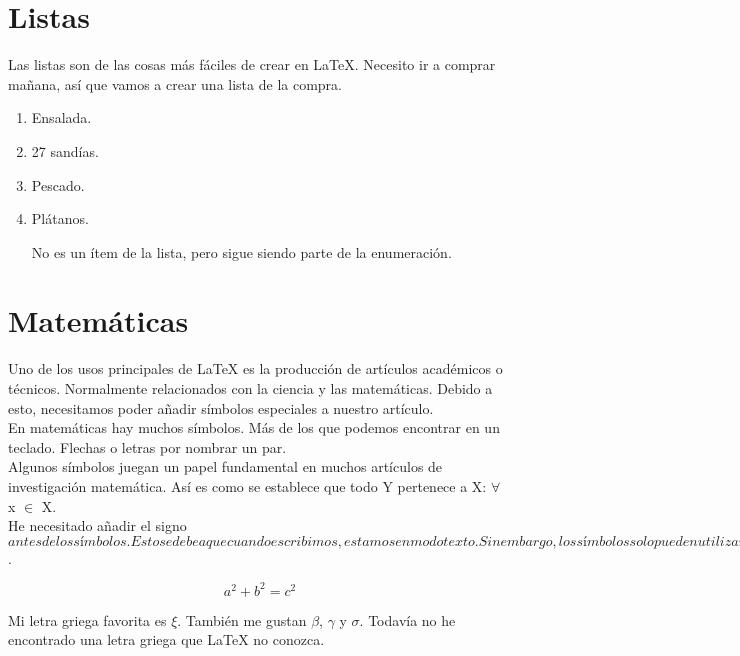\documentclass[12pt]{article}
\begin{document}
\section{Listas}
Las listas son de las cosas más fáciles de crear en LaTeX. Necesito ir a comprar mañana, así que vamos a crear una lista de la compra.
\begin{enumerate} %
  \item Ensalada.
  \item 27 sandías.
  \item Pescado.
  \item[cuántos?] Plátanos.

  No es un ítem de la lista, pero sigue siendo parte de la enumeración.

\end{enumerate} %

\section{Matemáticas}

Uno de los usos principales de LaTeX es la producción de artículos académicos o técnicos. Normalmente relacionados con la ciencia y las matemáticas. Debido a esto, necesitamos poder añadir símbolos especiales a nuestro artículo.\\

En matemáticas hay muchos símbolos. Más de los que podemos encontrar en un teclado. Flechas o letras por nombrar un par.\\

Algunos símbolos juegan un papel fundamental en muchos artículos de investigación matemática. Así es como se establece que todo Y pertenece a X:  $\forall$ x $\in$ X. \\
He necesitado añadir el signo $ antes de los símbolos. Esto se debe a que cuando escribimos, estamos en modo texto. Sin embargo, los símbolos solo pueden utilizarse en modo matemático, al cual se entra con el signo $.

\[a^2 + b^2 = c^2 \]

Mi letra griega favorita es $\xi$. También me gustan $\beta$, $\gamma$ y $\sigma$.
Todavía no he encontrado una letra griega que LaTeX no conozca.
\end{document}
